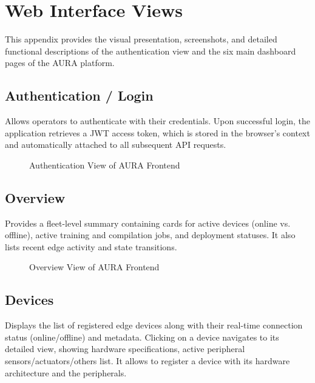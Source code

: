 \chapter{Web Interface Views}\label{ap:ui}

This appendix provides the visual presentation, screenshots, and detailed functional descriptions of the authentication view and the six main dashboard pages of the \gls{AURA} platform.


\section{Authentication / Login}

Allows operators to authenticate with their credentials. Upon successful login, the application retrieves a \gls{JWT} access token, which is stored in the browser's context and automatically attached to all subsequent \gls{API} requests.

\begin{figure}[H]
    \centering
    \caption{Authentication View of \acrshort{AURA} Frontend}
    \label{fig:screenshot_login}
\end{figure}

\section{Overview}

Provides a fleet-level summary containing cards for active devices (online vs. offline), active training and compilation jobs, and deployment statuses. It also lists recent edge activity and state transitions.

\begin{figure}[H]
    \centering
    \caption{Overview View of \acrshort{AURA} Frontend}
    \label{fig:screenshot_dashboard}
\end{figure}

\section{Devices}

Displays the list of registered edge devices along with their real-time connection status (online/offline) and metadata. Clicking on a device navigates to its detailed view, showing hardware specifications, active peripheral sensors/actuators/others list. It allows to register a device with its hardware architecture and the peripherals.

